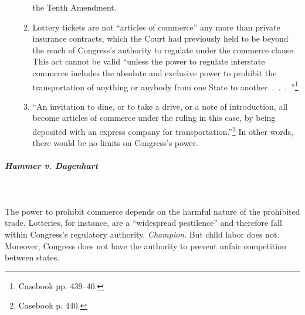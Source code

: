 \begin{enumerate}
\begin{enumerate}
        the Tenth Amendment.
        \item Lottery tickets are not ``articles of commerce'' any more than 
        private insurance contracts, which the Court had previously held to be 
        beyond the reach of Congress's authority to regulate under the 
        commerce clause. This act cannot be valid ``unless the power to 
        regulate interstate commerce includes the absolute and exclusive power 
        to prohibit the transportation of anything or anybody from one State 
        to another~.~.~.~''\footnote{Casebook pp. 439--40.}
        \item ``An invitation to dine, or to take a drive, or a note of 
        introduction, all become articles of commerce under the ruling in this 
        case, by being deposited with an express company for 
        transportation.''\footnote{Casebook p. 440.} In other words, there 
        would be no limits on Congress's power.
    \end{enumerate}
\end{enumerate}

\paragraph{\emph{Hammer v. Dagenhart}}
~\\\\
The power to prohibit commerce depends on the harmful nature of the prohibited 
trade. Lotteries, for instance, are a ``widespread pestilence'' and therefore 
fall within Congress's regulatory authority. \emph{Champion}. But child labor 
does not. Moreover, Congress does not have the authority to prevent unfair 
competition between states.


